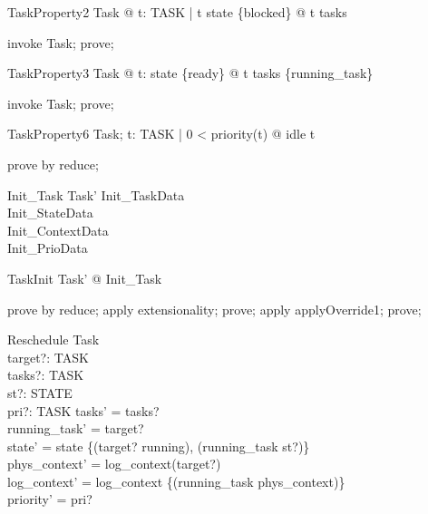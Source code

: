 \documentclass[a4paper, 12pt]{article}
\begin{document}
\begin{theorem}{TaskProperty2}
\forall  Task @ \forall  t: TASK | t \in  state \inv  \limg  \{blocked\} \rimg  @ t \in  tasks
\end{theorem}

\begin{zproof}[TaskProperty2]
invoke Task;
prove;
\end{zproof}

\begin{theorem}{TaskProperty3}
\forall  Task @ \forall  t: state \inv  \limg  \{ready\} \rimg  @ t \in  tasks \setminus  \{running\_task\}
\end{theorem}

\begin{zproof}[TaskProperty3]
invoke Task;
prove;
\end{zproof}

\begin{theorem}{TaskProperty6}
\forall  Task; t: TASK | 0 < priority(t) @ idle \neq  t
\end{theorem}

\begin{zproof}[TaskProperty6]
prove by reduce;
\end{zproof}

\begin{schema}{Init\_Task} %
  Task'
\where
  Init\_TaskData\\
  Init\_StateData\\
  Init\_ContextData\\
  Init\_PrioData
\end{schema}

\begin{theorem}{TaskInit}
\exists  Task' @ Init\_Task
\end{theorem}

\begin{zproof}[TaskInit]
prove by reduce;
apply extensionality;
prove;
apply applyOverride1;
prove;
\end{zproof}

\begin{schema}{Reschedule}
  \Delta Task\\
  target?: TASK\\
  tasks?: \power  TASK\\
  st?: STATE\\
  pri?: TASK \fun  \nat 
\where
  tasks' = tasks?\\
  running\_task' = target?\\
  state' = state \oplus  \{(target? \mapsto  running), (running\_task \mapsto  st?)\}\\
  phys\_context' = log\_context(target?)\\
  log\_context' = log\_context \oplus  \{(running\_task \mapsto  phys\_context)\}\\
  priority' = pri?
\end{schema}
\end{document}
